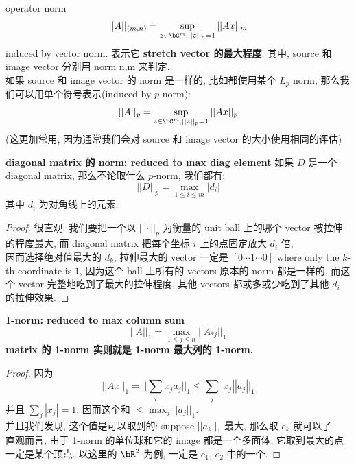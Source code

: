 \begin{example}
\begin{definition}{operator norm}
 $$
||A||_{(m,n)} = \sup _{z\in \bC^m, ||z||_n = 1  } ||Ax||_m
$$
induced by vector norm. 表示它\textbf{ stretch vector 的最大程度}. 其中, source 和 image vector 分别用 norm n,m 来判定.\\
如果 source 和 image vector 的 norm 是一样的, 比如都使用某个 $L_p$ norm, 那么我们可以用单个符号表示(induced by $p$-norm):$$ ||A||_{p} = \sup _{z\in \bC^m, ||z||_p= 1  } ||Ax||_p
$$
(这更加常用, 因为通常我们会对 source 和 image vector 的大小使用相同的评估)
\end{definition}

\begin{proposition}{\textbf{diagonal matrix 的 norm: reduced to max diag element}}
    如果 $D$ 是一个 diagonal matrix, 那么不论取什么 $p$-norm, 我们都有: $$
    ||D||_p = \max_{1 \leq i \leq m} |d_i|
    $$
    其中 $d_i$ 为对角线上的元素.
\end{proposition}
\begin{proof}
很直观. 我们要把一个以 $||\cdot||_p$ 为衡量的 unit ball 上的哪个 vector 被拉伸的程度最大,  而 diagonal matrix 把每个坐标 $i$ 上的点固定放大 $d_i$ 倍, \\
因而选择绝对值最大的 $d_k$, 拉伸最大的 vector 一定是 $[0\cdots1\cdots0]$ where only the $k$-th coordinate is $1$, 因为这个 ball 上所有的 vectors 原本的 norm 都是一样的, 而这个 vector 完整地吃到了最大的拉伸程度, 其他 vectors 都或多或少吃到了其他 $d_i$ 的拉伸效果.
\end{proof}

\begin{proposition}{\textbf{1-norm: reduced to max column sum}}
\begin{equation}
    ||A||_1 =  \max_{1 \leq j \leq n}  ||A_{*j}||_1
\end{equation}
\textbf{matrix 的 1-norm 实则就是 1-norm 最大列的 1-norm.}
\end{proposition}
\begin{proof}
    因为 
    $$
    ||Ax||_1 = || \sum_i x_j a_j ||_1 \leq \sum_j |x_j| |a_j||_1
    $$
    并且 $\sum_j |x_j| = 1$, 因而这个和 $\leq \max_j ||a_j||_1$.\\
    并且我们发现, 这个值是可以取到的: suppose $||a_k||_1$ 最大, 那么取 $e_k$ 就可以了.\\
直观而言, 由于 1-norm 的单位球和它的 image 都是一个多面体, 它取到最大的点一定是某个顶点. 以这里的 $\bR^2$ 为例, 一定是 $e_1$, $e_2$ 中的一个.
\end{proof}


\end{example}
